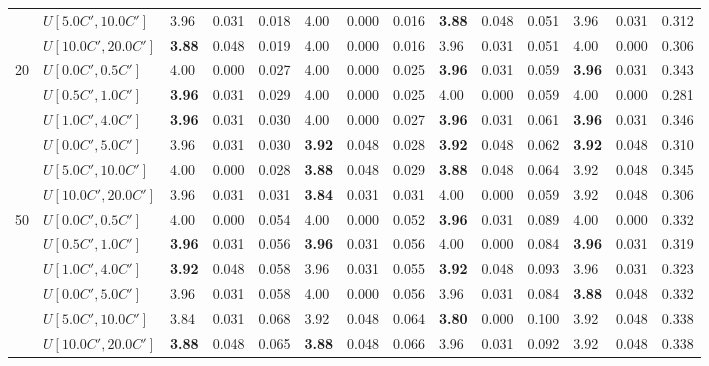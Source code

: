\begin{table}[h]
{\begin{tabular}{|l|l||l|l|l||l|l|l||l|l|l||l|l|l|}
       & $U[5.0C',10.0C']$ & 3.96 & 0.031 & 0.018 & 4.00 & 0.000 & 0.016 & \textbf{3.88} & 0.048 & 0.051 & 3.96 & 0.031 & 0.312 \\
       & $U[10.0C',20.0C']$ & \textbf{3.88} & 0.048 & 0.019 & 4.00 & 0.000 & 0.016 & 3.96 & 0.031 & 0.051 & 4.00 & 0.000 & 0.306 \\
      \hline\hline
      \multirow{6}{*}{20} & $U[0.0C',0.5C']$ & 4.00 & 0.000 & 0.027 & 4.00 & 0.000 & 0.025 & \textbf{3.96} & 0.031 & 0.059 & \textbf{3.96} & 0.031 & 0.343 \\
       & $U[0.5C',1.0C']$ & \textbf{3.96} & 0.031 & 0.029 & 4.00 & 0.000 & 0.025 & 4.00 & 0.000 & 0.059 & 4.00 & 0.000 & 0.281 \\
       & $U[1.0C',4.0C']$ & \textbf{3.96} & 0.031 & 0.030 & 4.00 & 0.000 & 0.027 & \textbf{3.96} & 0.031 & 0.061 & \textbf{3.96} & 0.031 & 0.346 \\
       & $U[0.0C',5.0C']$ & 3.96 & 0.031 & 0.030 & \textbf{3.92} & 0.048 & 0.028 & \textbf{3.92} & 0.048 & 0.062 & \textbf{3.92} & 0.048 & 0.310 \\
       & $U[5.0C',10.0C']$ & 4.00 & 0.000 & 0.028 & \textbf{3.88} & 0.048 & 0.029 & \textbf{3.88} & 0.048 & 0.064 & 3.92 & 0.048 & 0.345 \\
       & $U[10.0C',20.0C']$ & 3.96 & 0.031 & 0.031 & \textbf{3.84} & 0.031 & 0.031 & 4.00 & 0.000 & 0.059 & 3.92 & 0.048 & 0.306 \\
      \hline\hline
      \multirow{6}{*}{50} & $U[0.0C',0.5C']$ & 4.00 & 0.000 & 0.054 & 4.00 & 0.000 & 0.052 & \textbf{3.96} & 0.031 & 0.089 & 4.00 & 0.000 & 0.332 \\
       & $U[0.5C',1.0C']$ & \textbf{3.96} & 0.031 & 0.056 & \textbf{3.96} & 0.031 & 0.056 & 4.00 & 0.000 & 0.084 & \textbf{3.96} & 0.031 & 0.319 \\
       & $U[1.0C',4.0C']$ & \textbf{3.92} & 0.048 & 0.058 & 3.96 & 0.031 & 0.055 & \textbf{3.92} & 0.048 & 0.093 & 3.96 & 0.031 & 0.323 \\
       & $U[0.0C',5.0C']$ & 3.96 & 0.031 & 0.058 & 4.00 & 0.000 & 0.056 & 3.96 & 0.031 & 0.084 & \textbf{3.88} & 0.048 & 0.332 \\
       & $U[5.0C',10.0C']$ & 3.84 & 0.031 & 0.068 & 3.92 & 0.048 & 0.064 & \textbf{3.80} & 0.000 & 0.100 & 3.92 & 0.048 & 0.338 \\
       & $U[10.0C',20.0C']$ & \textbf{3.88} & 0.048 & 0.065 & \textbf{3.88} & 0.048 & 0.066 & 3.96 & 0.031 & 0.092 & 3.92 & 0.048 & 0.338 \\
      \hline
      \end{tabular}
      }
      \label{tab:pcpn90p2}\end{table}
      

